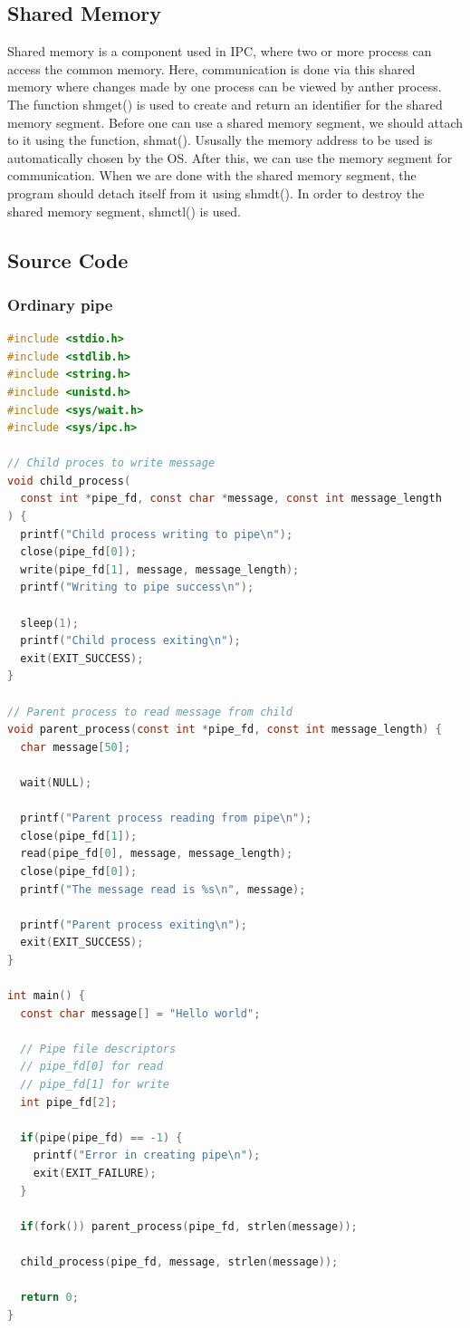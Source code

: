 \subsection{Shared Memory}
Shared memory is a component used in IPC, where two or more process can access
the common memory. Here, communication is done via this shared memory where
changes made by one process can be viewed by anther process. The function shmget()
is used to create and return an identifier for the shared memory segment. Before
one can use a shared memory segment, we should attach to it using the function,
shmat(). Ususally the memory address to be used is automatically chosen by the
OS. After this, we can use the memory segment for communication. When we are
done with the shared memory segment, the program should detach itself from it
using shmdt(). In order to destroy the shared memory segment, shmctl() is used.

\subsection{Source Code}
\subsubsection{Ordinary pipe}
\begin{lstlisting}[language=C]
#include <stdio.h>
#include <stdlib.h>
#include <string.h>
#include <unistd.h>
#include <sys/wait.h>
#include <sys/ipc.h>

// Child proces to write message
void child_process(
  const int *pipe_fd, const char *message, const int message_length
) {
  printf("Child process writing to pipe\n");
  close(pipe_fd[0]);
  write(pipe_fd[1], message, message_length);
  printf("Writing to pipe success\n");

  sleep(1);
  printf("Child process exiting\n");
  exit(EXIT_SUCCESS);
}

// Parent process to read message from child 
void parent_process(const int *pipe_fd, const int message_length) {
  char message[50];

  wait(NULL);

  printf("Parent process reading from pipe\n");
  close(pipe_fd[1]);
  read(pipe_fd[0], message, message_length);
  close(pipe_fd[0]);
  printf("The message read is %s\n", message);

  printf("Parent process exiting\n");
  exit(EXIT_SUCCESS);
}

int main() {
  const char message[] = "Hello world";
  
  // Pipe file descriptors
  // pipe_fd[0] for read
  // pipe_fd[1] for write
  int pipe_fd[2];

  if(pipe(pipe_fd) == -1) {
    printf("Error in creating pipe\n");
    exit(EXIT_FAILURE);
  }

  if(fork()) parent_process(pipe_fd, strlen(message));

  child_process(pipe_fd, message, strlen(message));
  
  return 0;
}
\end{lstlisting}

